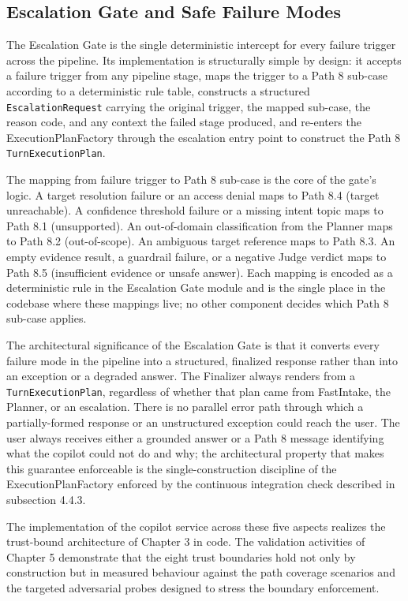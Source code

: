\subsection{Escalation Gate and Safe Failure Modes}
The Escalation Gate is the single deterministic intercept for every failure trigger across the pipeline. Its implementation is structurally simple by design: it accepts a failure trigger from any pipeline stage, maps the trigger to a Path 8 sub-case according to a deterministic rule table, constructs a structured \texttt{EscalationRequest} carrying the original trigger, the mapped sub-case, the reason code, and any context the failed stage produced, and re-enters the ExecutionPlanFactory through the escalation entry point to construct the Path 8 \texttt{TurnExecutionPlan}.

The mapping from failure trigger to Path 8 sub-case is the core of the gate's logic. A target resolution failure or an access denial maps to Path 8.4 (target unreachable). A confidence threshold failure or a missing intent topic maps to Path 8.1 (unsupported). An out-of-domain classification from the Planner maps to Path 8.2 (out-of-scope). An ambiguous target reference maps to Path 8.3. An empty evidence result, a guardrail failure, or a negative Judge verdict maps to Path 8.5 (insufficient evidence or unsafe answer). Each mapping is encoded as a deterministic rule in the Escalation Gate module and is the single place in the codebase where these mappings live; no other component decides which Path 8 sub-case applies.

The architectural significance of the Escalation Gate is that it converts every failure mode in the pipeline into a structured, finalized response rather than into an exception or a degraded answer. The Finalizer always renders from a \texttt{TurnExecutionPlan}, regardless of whether that plan came from FastIntake, the Planner, or an escalation. There is no parallel error path through which a partially-formed response or an unstructured exception could reach the user. The user always receives either a grounded answer or a Path 8 message identifying what the copilot could not do and why; the architectural property that makes this guarantee enforceable is the single-construction discipline of the ExecutionPlanFactory enforced by the continuous integration check described in subsection 4.4.3.

The implementation of the copilot service across these five aspects realizes the trust-bound architecture of Chapter 3 in code. The validation activities of Chapter 5 demonstrate that the eight trust boundaries hold not only by construction but in measured behaviour against the path coverage scenarios and the targeted adversarial probes designed to stress the boundary enforcement.

